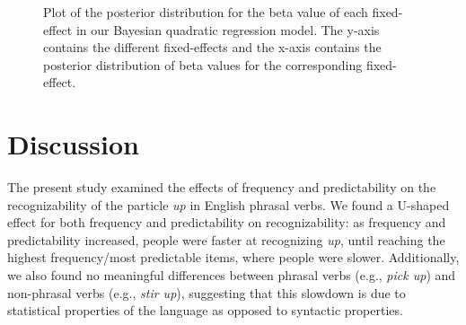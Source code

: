 \documentclass[
  12pt,
  letterpaper,
]{scrreprt}
\begin{document}
\begin{figure}[htbp]

\caption{\label{fig-posteriorplotFullQuadratic}Plot of the posterior
distribution for the beta value of each fixed-effect in our Bayesian
quadratic regression model. The y-axis contains the different
fixed-effects and the x-axis contains the posterior distribution of beta
values for the corresponding fixed-effect.}


\end{figure}%

\section{Discussion}\label{discussion-4}

The present study examined the effects of frequency and predictability
on the recognizability of the particle \emph{up} in English phrasal
verbs. We found a U-shaped effect for both frequency and predictability
on recognizability: as frequency and predictability increased, people
were faster at recognizing \emph{up}, until reaching the highest
frequency/most predictable items, where people were slower.
Additionally, we also found no meaningful differences between phrasal
verbs (e.g., \emph{pick up}) and non-phrasal verbs (e.g., \emph{stir
up}), suggesting that this slowdown is due to statistical properties of
the language as opposed to syntactic properties.
\end{document}
